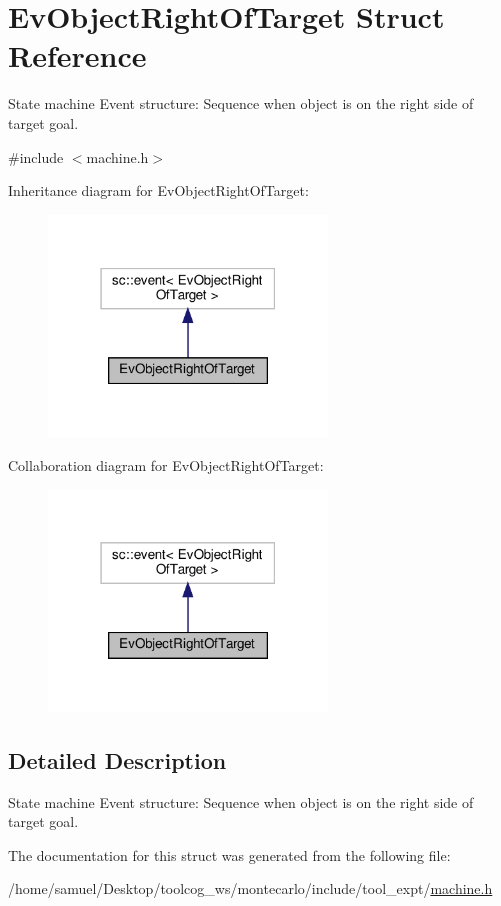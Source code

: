\hypertarget{structEvObjectRightOfTarget}{}\section{Ev\+Object\+Right\+Of\+Target Struct Reference}
\label{structEvObjectRightOfTarget}


State machine Event structure\+: Sequence when object is on the right side of target goal.  




{\ttfamily \#include $<$machine.\+h$>$}



Inheritance diagram for Ev\+Object\+Right\+Of\+Target\+:
\nopagebreak
\begin{figure}[H]
\begin{center}
\leavevmode
\includegraphics[width=210pt]{structEvObjectRightOfTarget__inherit__graph}
\end{center}
\end{figure}


Collaboration diagram for Ev\+Object\+Right\+Of\+Target\+:
\nopagebreak
\begin{figure}[H]
\begin{center}
\leavevmode
\includegraphics[width=210pt]{structEvObjectRightOfTarget__coll__graph}
\end{center}
\end{figure}


\subsection{Detailed Description}
State machine Event structure\+: Sequence when object is on the right side of target goal. 

The documentation for this struct was generated from the following file\+:\begin{DoxyCompactItemize}
\item 
/home/samuel/\+Desktop/toolcog\+\_\+ws/montecarlo/include/tool\+\_\+expt/\hyperlink{machine_8h}{machine.\+h}\end{DoxyCompactItemize}
